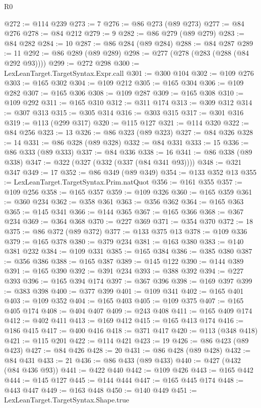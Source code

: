 \begin{lexlean}{R0}
\begin{coremodule}
@272 := @114 @239
@273 := 7
@276 := @86 @273 (@89 @273)
@277 := @84 @276
@278 := @84 @212
@279 := 9
@282 := @86 @279 (@89 @279)
@283 := @84 @282
@284 := 10
@287 := @86 @284 (@89 @284)
@288 := @84 @287
@289 := 11
@292 := @86 @289 (@89 @289)
@298 := @277 (@278 (@283 (@288 (@84 @292 @93))))
@299 := @272 @298
@300 := LexLeanTarget.TargetSyntax.Expr.call
@301 := @300 @104
@302 := @109 @276
@303 := @165 @302
@304 := @109 @212
@305 := @165 @304
@306 := @109 @282
@307 := @165 @306
@308 := @109 @287
@309 := @165 @308
@310 := @109 @292
@311 := @165 @310
@312 := @311 @174
@313 := @309 @312
@314 := @307 @313
@315 := @305 @314
@316 := @303 @315
@317 := @301 @316
@319 := @113 (@299 @317)
@320 := @115 @127
@321 := @114 @320
@322 := @84 @256
@323 := 13
@326 := @86 @323 (@89 @323)
@327 := @84 @326
@328 := 14
@331 := @86 @328 (@89 @328)
@332 := @84 @331
@333 := 15
@336 := @86 @333 (@89 @333)
@337 := @84 @336
@338 := 16
@341 := @86 @338 (@89 @338)
@347 := @322 (@327 (@332 (@337 (@84 @341 @93))))
@348 := @321 @347
@349 := 17
@352 := @86 @349 (@89 @349)
@354 := @133 @352 @13
@355 := LexLeanTarget.TargetSyntax.Prim.natQuot
@356 := @161 @355
@357 := @109 @256
@358 := @165 @357
@359 := @109 @326
@360 := @165 @359
@361 := @360 @234
@362 := @358 @361
@363 := @356 @362
@364 := @165 @363
@365 := @145 @341
@366 := @144 @365
@367 := @165 @366
@368 := @367 @234
@369 := @364 @368
@370 := @227 @369
@371 := @354 @370
@372 := 18
@375 := @86 @372 (@89 @372)
@377 := @133 @375 @13
@378 := @109 @336
@379 := @165 @378
@380 := @379 @234
@381 := @163 @380
@383 := @140 @381 @232
@384 := @109 @331
@385 := @165 @384
@386 := @385 @380
@387 := @356 @386
@388 := @165 @387
@389 := @145 @122
@390 := @144 @389
@391 := @165 @390
@392 := @391 @234
@393 := @388 @392
@394 := @227 @393
@396 := @165 @394 @174
@397 := @367 @396
@398 := @169 @397
@399 := @383 @398
@400 := @377 @399
@401 := @109 @341
@402 := @165 @401
@403 := @109 @352
@404 := @165 @403
@405 := @109 @375
@407 := @165 @405 @174
@408 := @404 @407
@409 := @243 @408
@411 := @165 @409 @174
@412 := @402 @411
@413 := @169 @412
@415 := @165 @413 @174
@416 := @186 @415
@417 := @400 @416
@418 := @371 @417
@420 := @113 (@348 @418)
@421 := @115 @201
@422 := @114 @421
@423 := 19
@426 := @86 @423 (@89 @423)
@427 := @84 @426
@428 := 20
@431 := @86 @428 (@89 @428)
@432 := @84 @431
@433 := 21
@436 := @86 @433 (@89 @433)
@440 := @427 (@432 (@84 @436 @93))
@441 := @422 @440
@442 := @109 @426
@443 := @165 @442
@444 := @145 @127
@445 := @144 @444
@447 := @165 @445 @174
@448 := @443 @447
@449 := @163 @448
@450 := @140 @449
@451 := LexLeanTarget.TargetSyntax.Shape.true

\end{coremodule}
\end{lexlean}
